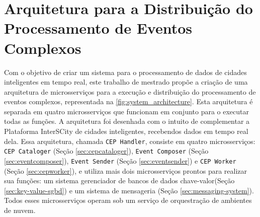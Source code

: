 \chapter{Arquitetura para a Distribuição do Processamento de Eventos Complexos}
\label{cap:arquitetura}

Com o objetivo de criar um sistema para o processamento de dados de cidades inteligentes em tempo real, este trabalho de mestrado propõe a criação de uma arquitetura de microsserviços para a execução e distribuição do processamento de eventos complexos, representada na \autoref{fig:system_architecture}. Esta arquitetura é separada em quatro microsserviços que funcionam em conjunto para o executar todas as funções. A arquitetura foi desenhada com o intuito de complementar a Plataforma InterSCity de cidades inteligentes, recebendos dados em tempo real dela. %
Essa arquitetura, chamada \texttt{CEP Handler}, consiste em quatro microsserviços: \texttt{CEP Cataloger} (Seção \ref{sec:cepcataloger}), \texttt{Event Composer} (Seção \ref{sec:eventcomposer}), \texttt{Event Sender} (Seção  \ref{sec:eventsender}) e \texttt{CEP Worker} (Seção \ref{sec:cepworker}), e utiliza mais dois microsserviços prontos para realizar sua funções: um sistema gerenciador de bancos de dados chave-valor(Seção  \ref{sec:key-value-sgbd}) e um sistema de mensageria (Seção \ref{sec:messaging-system}). Todos esses microsserviços operam sob um serviço de orquestração de ambientes de nuvem.



